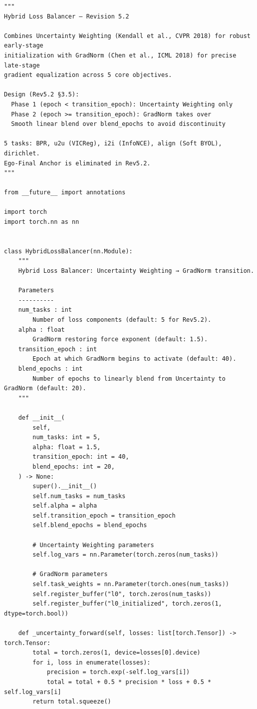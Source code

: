 \documentclass[11pt,a4paper]{article}
\begin{document}
\begin{lstlisting}[style=pythonstyle]
"""
Hybrid Loss Balancer — Revision 5.2

Combines Uncertainty Weighting (Kendall et al., CVPR 2018) for robust early-stage
initialization with GradNorm (Chen et al., ICML 2018) for precise late-stage
gradient equalization across 5 core objectives.

Design (Rev5.2 §3.5):
  Phase 1 (epoch < transition_epoch): Uncertainty Weighting only
  Phase 2 (epoch >= transition_epoch): GradNorm takes over
  Smooth linear blend over blend_epochs to avoid discontinuity

5 tasks: BPR, u2u (VICReg), i2i (InfoNCE), align (Soft BYOL), dirichlet.
Ego-Final Anchor is eliminated in Rev5.2.
"""

from __future__ import annotations

import torch
import torch.nn as nn


class HybridLossBalancer(nn.Module):
    """
    Hybrid Loss Balancer: Uncertainty Weighting → GradNorm transition.

    Parameters
    ----------
    num_tasks : int
        Number of loss components (default: 5 for Rev5.2).
    alpha : float
        GradNorm restoring force exponent (default: 1.5).
    transition_epoch : int
        Epoch at which GradNorm begins to activate (default: 40).
    blend_epochs : int
        Number of epochs to linearly blend from Uncertainty to GradNorm (default: 20).
    """

    def __init__(
        self,
        num_tasks: int = 5,
        alpha: float = 1.5,
        transition_epoch: int = 40,
        blend_epochs: int = 20,
    ) -> None:
        super().__init__()
        self.num_tasks = num_tasks
        self.alpha = alpha
        self.transition_epoch = transition_epoch
        self.blend_epochs = blend_epochs

        # Uncertainty Weighting parameters
        self.log_vars = nn.Parameter(torch.zeros(num_tasks))

        # GradNorm parameters
        self.task_weights = nn.Parameter(torch.ones(num_tasks))
        self.register_buffer("l0", torch.zeros(num_tasks))
        self.register_buffer("l0_initialized", torch.zeros(1, dtype=torch.bool))

    def _uncertainty_forward(self, losses: list[torch.Tensor]) -> torch.Tensor:
        total = torch.zeros(1, device=losses[0].device)
        for i, loss in enumerate(losses):
            precision = torch.exp(-self.log_vars[i])
            total = total + 0.5 * precision * loss + 0.5 * self.log_vars[i]
        return total.squeeze()


\end{lstlisting}
\end{document}
